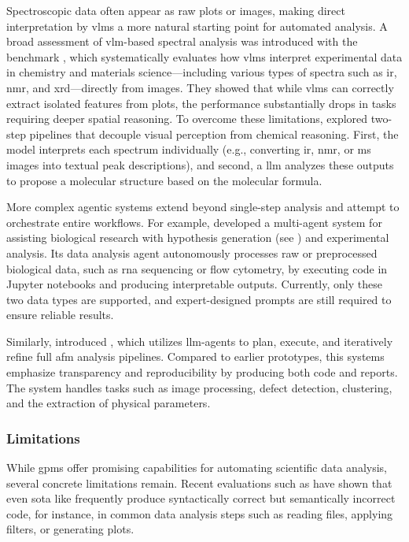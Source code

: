 Spectroscopic data often appear as raw plots or images, making direct interpretation by \glspl{vlm} a more natural starting point for automated analysis. 
A broad assessment of \gls{vlm}-based spectral analysis was introduced with the  benchmark \autocite{alampara2024probing}, which systematically evaluates how \glspl{vlm} interpret experimental data in chemistry and materials science---including various types of spectra such as \gls{ir}, \gls{nmr}, and \gls{xrd}---directly from images. They showed that while \glspl{vlm} can correctly extract isolated features from plots, the performance substantially drops in tasks requiring deeper spatial reasoning.
To overcome these limitations, \textcite{kawchak2024high} explored two-step pipelines that decouple visual perception from chemical reasoning. First, the model interprets each spectrum individually (e.g., converting  \gls{ir}, \gls{nmr}, or \gls{ms} images into textual peak descriptions), and second, a \gls{llm} analyzes these outputs to propose a molecular structure based on the molecular formula. 


More complex agentic systems extend beyond single-step analysis and attempt to orchestrate entire workflows. 
For example, \textcite{ghareeb2025robin0} developed a multi-agent system for assisting biological research with hypothesis generation (see ) and experimental analysis. Its data analysis agent  autonomously processes raw or preprocessed biological data, such as \gls{rna} sequencing or flow cytometry, by executing code in Jupyter notebooks and producing interpretable outputs. Currently, only these two data types are supported, and expert-designed prompts are still required to ensure reliable results. 

Similarly, \textcite{mandal2024autonomous} introduced , which utilizes \gls{llm}-agents to plan, execute, and iteratively refine full \gls{afm} analysis pipelines. Compared to earlier prototypes, this systems emphasize transparency and reproducibility by producing both code and reports.
The system handles tasks such as image processing, defect detection, clustering, and the extraction of physical parameters. 

\subsubsection{Limitations}
While \glspl{gpm} offer promising capabilities for automating scientific data analysis, several concrete limitations remain. 
Recent evaluations such as  \autocite{tian2024scicode} have shown that even \gls{sota} like  frequently produce syntactically correct but semantically incorrect code, for instance, in common data analysis steps such as reading files, applying filters, or generating plots.

